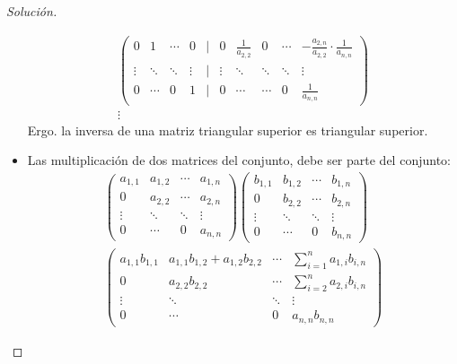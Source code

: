 \documentclass[12pt]{book}
\newenvironment{solucion}
  {\renewcommand\qedsymbol{$\square$}\begin{proof}[Solución]}
  {\end{proof}}
\begin{document}
\begin{solucion}
\begin{itemize}
\begin{align*}
\begin{pmatrix}
                0&1&\cdots&0&|&0&\frac{1}{a_{2,2}}&0&\cdots&-\frac{a_{2,n}}{a_{2,2}}\cdot\frac{1}{a_{n,n}}\\
                \vdots&\ddots&\ddots&\vdots&|&\vdots&\ddots&\ddots&\ddots&\vdots\\
                0&\cdots&0&1&|&0&\cdots&\cdots&0&\frac{1}{a_{n,n}}
            \end{pmatrix}\\
            \vdots
        \end{align*}
    Ergo. la inversa de una matriz triangular superior es triangular superior.
    \item Las multiplicación de dos matrices del conjunto, debe ser parte del conjunto:
        \begin{align*}
            \begin{pmatrix}
            a_{1,1}&a_{1,2}&\cdots&a_{1,n}\\
            0&a_{2,2}&\cdots&a_{2,n}\\
            \vdots&\ddots&\ddots&\vdots\\
            0&\cdots&0&a_{n,n}
            \end{pmatrix}\begin{pmatrix}
            b_{1,1}&b_{1,2}&\cdots&b_{1,n}\\
            0&b_{2,2}&\cdots&b_{2,n}\\
            \vdots&\ddots&\ddots&\vdots\\
            0&\cdots&0&b_{n,n}
            \end{pmatrix}\\\begin{pmatrix}
            a_{1,1}b_{1,1}&a_{1,1}b_{1,2}+a_{1,2}b_{2,2}&\cdots&\sum_{i=1}^na_{1,i}b_{i,n}\\
            0&a_{2,2}b_{2,2}&\cdots&\sum_{i=2}^na_{2,i}b_{i,n}\\
            \vdots&\ddots&\ddots&\vdots\\
            0&\cdots&0&a_{n,n}b_{n,n}
            \end{pmatrix}
        \end{align*}
        
    \end{itemize}
\end{solucion}
\end{document}
